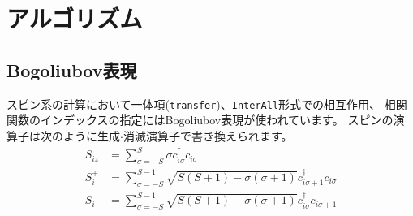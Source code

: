 \chapter{アルゴリズム}
\label{Ch:algorithm}

\section{Bogoliubov表現}\label{sec_bogoliubov_rep}

スピン系の計算において一体項(\verb|transfer|)、\verb|InterAll|形式での相互作用、
相関関数のインデックスの指定にはBogoliubov表現が使われています。
スピンの演算子は次のように生成$\cdot$消滅演算子で書き換えられます。
\begin{align}
  S_{i z} &= \sum_{\sigma = -S}^{S} \sigma c_{i \sigma}^\dagger c_{i \sigma}
  \\
  S_{i}^+ &= \sum_{\sigma = -S}^{S-1} 
  \sqrt{S(S+1) - \sigma(\sigma+1)} 
  c_{i \sigma+1}^\dagger c_{i \sigma}
  \\
  S_{i}^- &= \sum_{\sigma = -S}^{S-1} 
  \sqrt{S(S+1) - \sigma(\sigma+1)} 
  c_{i \sigma}^\dagger c_{i \sigma+1}
\end{align}

